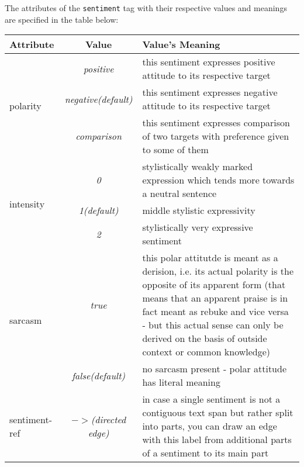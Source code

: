 \documentclass[11pt,a4paper]{article}
\begin{document}
The attributes of the \texttt{sentiment} tag with their respective
values and meanings are specified in the table below:\\
\begin{tabular}[t]{|l|c|p{}|}\hline
  Attribute & Value & Value's Meaning\\\hline
  \multirow{3}{*}{polarity} & \textit{positive} & this sentiment
  expresses positive attitude to its respective target\\\cline{2-3}

  & \textit{negative\newline(default)} & this sentiment
  expresses negative attitude to its respective target\\\cline{2-3}

  & \textit{comparison} & this sentiment expresses comparison of two
  targets with preference given to some of them\\\hline
  \multirow{3}{*}{intensity} & \textit{0} & stylistically weakly
  marked expression which tends more towards a neutral
  sentence\\\cline{2-3}

  & \textit{1\newline(default)} & middle stylistic
  expressivity\\\cline{2-3}

  & \textit{2} & stylistically very expressive sentiment\\\hline
  \multirow{2}{*}{sarcasm} & \textit{true} & this polar attitutde is
  meant as a derision, i.e. its actual polarity is the opposite of its
  apparent form (that means that an apparent praise is in fact meant
  as rebuke and vice versa - but this actual sense can only be derived
  on the basis of outside context or common knowledge)\\\cline{2-3}

  & \textit{false\newline(default)} & no sarcasm present - polar
  attitude has literal meaning\\\hline
  sentiment-ref & \textit{$->$\newline(directed edge)} & in case a
  single sentiment is not a contiguous text span but rather split into
  parts, you can draw an edge with this label from additional parts of
  a sentiment to its main part\\\hline
\end{tabular}
\end{document}
